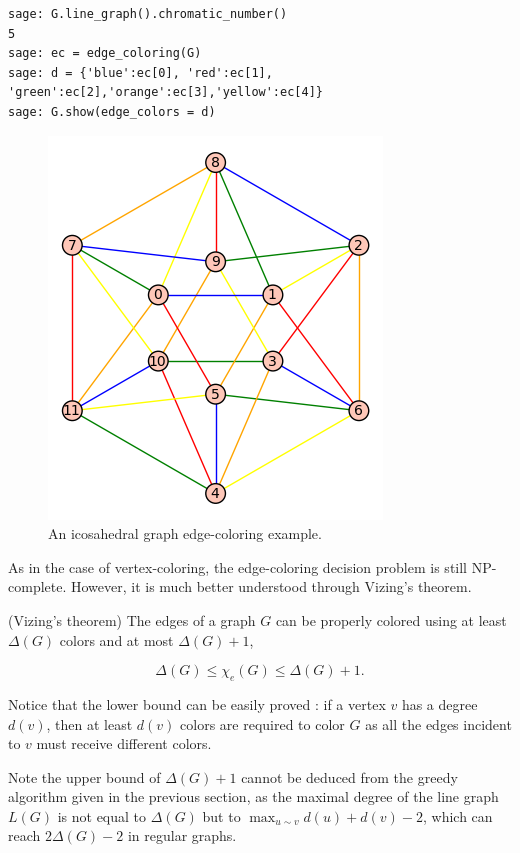\begin{lstlisting}
sage: G.line_graph().chromatic_number()
5
sage: ec = edge_coloring(G)
sage: d = {'blue':ec[0], 'red':ec[1], 'green':ec[2],'orange':ec[3],'yellow':ec[4]}
sage: G.show(edge_colors = d)
\end{lstlisting}

\begin{figure}[!htbp]
\centering
{}
\includegraphics[scale=0.7]{image/graph-coloring/icosahedral-graph-edge-coloring-example}
\caption{An icosahedral graph edge-coloring example.}
\label{fig:graph-coloring:icosahedral-graph-edge-coloring-example}
\end{figure}

As in the case of vertex-coloring, the edge-coloring decision problem is
still NP-complete. However, it is much better understood through
Vizing's theorem.

\begin{theorem}
(Vizing's theorem)
The edges of a graph $G$ can be properly colored using at least
$\Delta(G)$ colors and at most $\Delta(G)+1$,

\[
\Delta(G)\leq \chi_e(G)\leq \Delta(G)+1.
\]
\end{theorem}

Notice that the lower bound can be easily proved : if a vertex
$v$ has a degree $d(v)$, then at least $d(v)$ colors are required
to color $G$ as all the edges incident to $v$ must receive
different colors.

Note the upper bound of $\Delta(G)+1$
cannot be deduced from the greedy algorithm given in the
previous section, as the maximal degree of the line graph
$L(G)$ is not equal to
$\Delta(G)$ but to $\displaystyle \max_{u\sim v}d(u)+d(v)-2$, which
can reach $2\Delta(G)-2$ in regular graphs.



